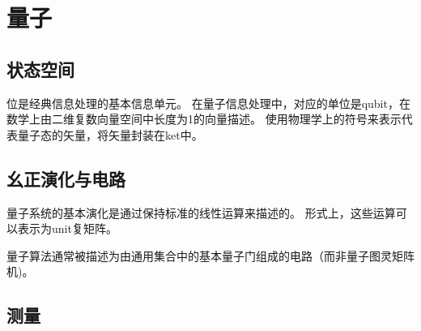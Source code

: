 \chapter{量子}
\label{chap:量子}

\section{状态空间}

位是经典信息处理的基本信息单元。 在量子信息处理中，对应的单位是qubit，在数学上由二维复数向量空间中长度为1的向量描述。 使用物理学上的符号来表示代表量子态的矢量，将矢量封装在ket中。

\section{幺正演化与电路}


量子系统的基本演化是通过保持标准的线性运算来描述的。 形式上，这些运算可以表示为unit复矩阵。

量子算法通常被描述为由通用集合中的基本量子门组成的电路（而非量子图灵矩阵机)。

\section{测量}


